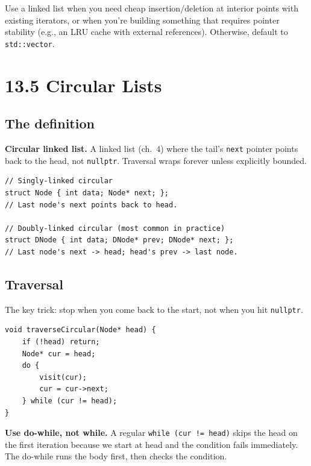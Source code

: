\documentclass[11pt]{article}
\begin{document}
Use a linked list when you need cheap insertion/deletion at interior points with existing iterators, or when you're building something that requires pointer stability (e.g., an LRU cache with external references). Otherwise, default to \texttt{std::vector}.

\section{13.5 Circular Lists}

\subsection*{The definition}

\begin{defnbox}
\textbf{Circular linked list.} A linked list (ch.~4) where the tail's \texttt{next} pointer points back to the head, not \texttt{nullptr}. Traversal wraps forever unless explicitly bounded.
\end{defnbox}

\begin{lstlisting}[basicstyle=\ttfamily\small,frame=single]
// Singly-linked circular
struct Node { int data; Node* next; };
// Last node's next points back to head.

// Doubly-linked circular (most common in practice)
struct DNode { int data; DNode* prev; DNode* next; };
// Last node's next -> head; head's prev -> last node.
\end{lstlisting}

\subsection*{Traversal}

The key trick: stop when you come back to the start, not when you hit \texttt{nullptr}.

\begin{lstlisting}[basicstyle=\ttfamily\small,frame=single]
void traverseCircular(Node* head) {
    if (!head) return;
    Node* cur = head;
    do {
        visit(cur);
        cur = cur->next;
    } while (cur != head);
}
\end{lstlisting}

\begin{warnbox}
\textbf{Use do-while, not while.} A regular \texttt{while (cur != head)} skips the head on the first iteration because we start at head and the condition fails immediately. The do-while runs the body first, then checks the condition.
\end{warnbox}
\end{document}
